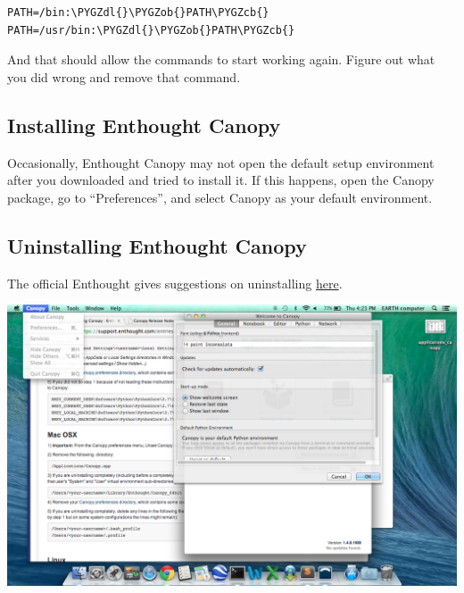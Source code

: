 \documentclass[letterpaper,10pt,english]{sphinxmanual}
\def\PYGZob{\char`\{}
\def\PYGZcb{\char`\}}
\def\PYGZdl{\char`\$}
\begin{document}
\begin{Verbatim}[commandchars=\\\{\}]
PATH=/bin:\PYGZdl{}\PYGZob{}PATH\PYGZcb{}
PATH=/usr/bin:\PYGZdl{}\PYGZob{}PATH\PYGZcb{}
\end{Verbatim}

And that should allow the commands to start working again. Figure out what you did wrong and remove that command.


\subsection{Installing Enthought Canopy}
\label{docfiles/install_dependencies:installing-enthought-canopy}
Occasionally, Enthought Canopy may not open the default setup environment after you downloaded and tried to install it. If this happens, open the Canopy package, go to ``Preferences'', and select Canopy as your default environment.


\subsection{Uninstalling Enthought Canopy}
\label{docfiles/install_dependencies:uninstalling-enthought-canopy}
The official Enthought gives suggestions on uninstalling \href{https://guide.macports.org/chunked/installing.macports.uninstalling.html}{here}.

\includegraphics{canopy_preferences.png}
\end{document}
